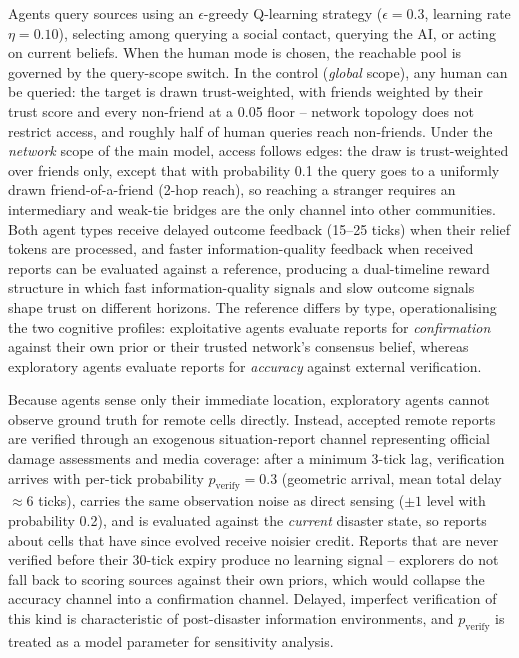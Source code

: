 \documentclass[pdflatex,sn-basic]{sn-jnl}
\begin{document}
Agents query sources using an $\epsilon$-greedy Q-learning strategy ($\epsilon = 0.3$, learning rate $\eta = 0.10$), selecting among querying a social contact, querying the AI, or acting on current beliefs. When the human mode is chosen, the reachable pool is governed by the query-scope switch. In the control (\emph{global} scope), any human can be queried: the target is drawn trust-weighted, with friends weighted by their trust score and every non-friend at a 0.05 floor -- network topology does not restrict access, and roughly half of human queries reach non-friends. Under the \emph{network} scope of the main model, access follows edges: the draw is trust-weighted over friends only, except that with probability 0.1 the query goes to a uniformly drawn friend-of-a-friend (2-hop reach), so reaching a stranger requires an intermediary and weak-tie bridges are the only channel into other communities. Both agent types receive delayed outcome feedback (15--25 ticks) when their relief tokens are processed, and faster information-quality feedback when received reports can be evaluated against a reference, producing a dual-timeline reward structure in which fast information-quality signals and slow outcome signals shape trust on different horizons. %
The reference differs by type, operationalising the two cognitive profiles: exploitative agents evaluate reports for \emph{confirmation} against their own prior or their trusted network's consensus belief, whereas exploratory agents evaluate reports for \emph{accuracy} against external verification.

Because agents sense only their immediate location, exploratory agents cannot observe ground truth for remote cells directly. Instead, accepted remote reports are verified through an exogenous situation-report channel representing official damage assessments and media coverage: after a minimum 3-tick lag, verification arrives with per-tick probability $p_{\text{verify}} = 0.3$ (geometric arrival, mean total delay $\approx 6$ ticks), carries the same observation noise as direct sensing ($\pm 1$ level with probability 0.2), and is evaluated against the \emph{current} disaster state, so reports about cells that have since evolved receive noisier credit. Reports that are never verified before their 30-tick expiry produce no learning signal -- explorers do not fall back to scoring sources against their own priors, which would collapse the accuracy channel into a confirmation channel. Delayed, imperfect verification of this kind is characteristic of post-disaster information environments, and $p_{\text{verify}}$ is treated as a model parameter for sensitivity analysis.
\end{document}
